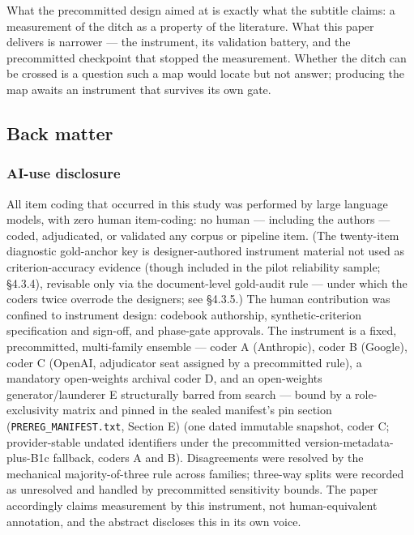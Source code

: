 What the precommitted design aimed at is exactly what the subtitle claims: a measurement of the ditch as a property of the literature. What this paper delivers is narrower --- the instrument, its validation battery, and the precommitted checkpoint that stopped the measurement. Whether the ditch can be crossed is a question such a map would locate but not answer; producing the map awaits an instrument that survives its own gate.

\subsection{Back matter}\label{back-matter}

\subsubsection{AI-use disclosure}\label{ai-use-disclosure}

All item coding that occurred in this study was performed by large language models, with zero human item-coding: no human --- including the authors --- coded, adjudicated, or validated any corpus or pipeline item. (The twenty-item diagnostic gold-anchor key is designer-authored instrument material not used as criterion-accuracy evidence (though included in the pilot reliability sample; \S{}4.3.4), revisable only via the document-level gold-audit rule --- under which the coders twice overrode the designers; see \S{}4.3.5.) The human contribution was confined to instrument design: codebook authorship, synthetic-criterion specification and sign-off, and phase-gate approvals. The instrument is a fixed, precommitted, multi-family ensemble --- coder A (Anthropic), coder B (Google), coder C (OpenAI, adjudicator seat assigned by a precommitted rule), a mandatory open-weights archival coder D, and an open-weights generator/launderer E structurally barred from search --- bound by a role-exclusivity matrix and pinned in the sealed manifest's pin section (\texttt{PREREG\_MANIFEST.txt}, Section E) (one dated immutable snapshot, coder C; provider-stable undated identifiers under the precommitted version-metadata-plus-B1c fallback, coders A and B). Disagreements were resolved by the mechanical majority-of-three rule across families; three-way splits were recorded as unresolved and handled by precommitted sensitivity bounds. The paper accordingly claims measurement by this instrument, not human-equivalent annotation, and the abstract discloses this in its own voice.

